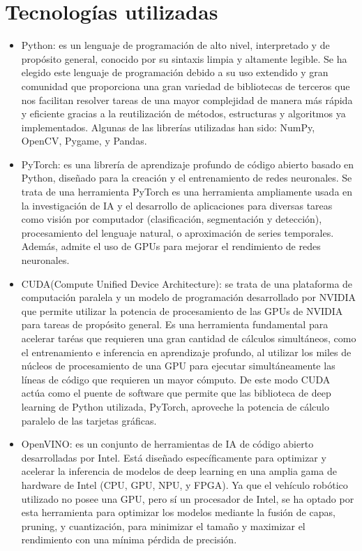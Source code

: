 \documentclass[12pt,a4paper,onecolumn,oneside]{report}
\begin{document}
\section*{Tecnologías utilizadas}
\begin{itemize}
\item Python: es un lenguaje de programación de alto nivel, interpretado y de propósito general, conocido por su sintaxis limpia y altamente legible. Se ha elegido este lenguaje de programación debido a su uso extendido y gran comunidad que proporciona una gran variedad de bibliotecas de terceros que nos facilitan resolver tareas de una mayor complejidad de manera más rápida y eficiente gracias a la reutilización de métodos, estructuras y algoritmos ya implementados. Algunas de las librerías utilizadas han sido: NumPy, OpenCV, Pygame, y Pandas.

\item PyTorch: es una librería de aprendizaje profundo de código abierto basado en Python, diseñado para la creación y el entrenamiento de redes neuronales. Se trata de una herramienta PyTorch es una herramienta ampliamente usada en la investigación de IA y el desarrollo de aplicaciones para diversas tareas como visión por computador (clasificación, segmentación y detección), procesamiento del lenguaje natural, o aproximación de series temporales. Además, admite el uso de GPUs para mejorar el rendimiento de redes neuronales.

\item CUDA(Compute Unified Device Architecture): se trata de una plataforma de computación paralela y un modelo de programación desarrollado por NVIDIA que permite utilizar la potencia de procesamiento de las GPUs de NVIDIA para tareas de propósito general. Es una herramienta fundamental para acelerar taréas que requieren una gran cantidad de cálculos simultáneos, como el entrenamiento e inferencia en aprendizaje profundo, al utilizar los miles de núcleos de procesamiento de una GPU para ejecutar simultáneamente las líneas de código que requieren un mayor cómputo. De este modo CUDA actúa como el puente de software que permite que las biblioteca de deep learning de Python utilizada, PyTorch, aproveche la potencia de cálculo paralelo de las tarjetas gráficas.

\item OpenVINO: es un conjunto de herramientas de IA de código abierto desarrolladas por Intel. Está diseñado específicamente para optimizar y acelerar la inferencia de modelos de deep learning en una amplia gama de hardware de Intel (CPU, GPU, NPU, y FPGA). Ya que el vehículo robótico utilizado no posee una GPU, pero sí un procesador de Intel, se ha optado por esta herramienta para optimizar los modelos mediante la fusión de capas, pruning, y cuantización, para minimizar el tamaño y maximizar el rendimiento con una mínima pérdida de precisión.


\end{itemize}
\end{document}
